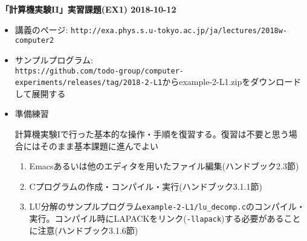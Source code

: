 \documentclass[11pt]{jarticle}
\begin{document}
\noindent
{\bf\large 「計算機実験II」実習課題(EX1) 2018-10-12}
\\[-0.5em]

\noindent
\begin{itemize}
\item 講義のページ: \verb+http://exa.phys.s.u-tokyo.ac.jp/ja/lectures/2018w-computer2+

\item サンプルプログラム: \\ {\small \verb+https://github.com/todo-group/computer-experiments/releases/tag/2018-2-L1+}からexample-2-L1.zipをダウンロードして展開する

\item 準備練習
  
  計算機実験Iで行った基本的な操作・手順を復習する。復習は不要と思う場合にはそのまま基本課題に進んでよい
  \begin{enumerate}
  \item Emacsあるいは他のエディタを用いたファイル編集(ハンドブック2.3節)
  \item Cプログラムの作成・コンパイル・実行(ハンドブック3.1.1節)
  \item LU分解のサンプルプログラム{\tt example-2-L1/lu\_decomp.c}のコンパイル・実行。コンパイル時にLAPACKをリンク({\tt -llapack})する必要があることに注意(ハンドブック3.1.6節)
  \end{enumerate}


\end{itemize}
\end{document}
